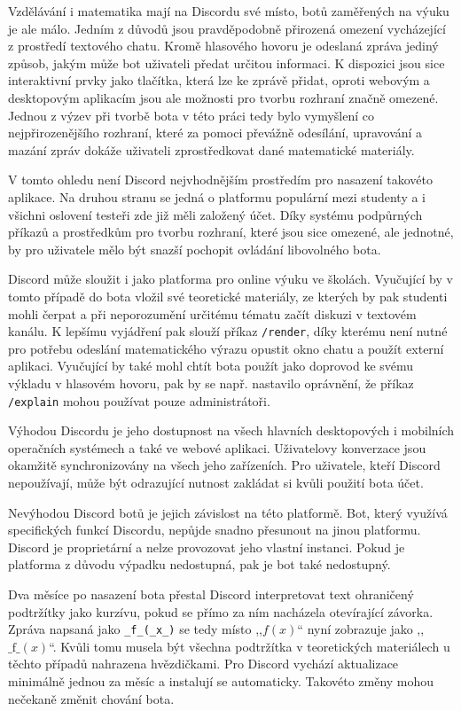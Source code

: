 \documentclass[FM]{tulthesis}
\begin{document}
	Vzdělávání i matematika mají na Discordu své místo, botů zaměřených na výuku je ale málo. Jedním z důvodů jsou pravděpodobně přirozená omezení vycházející z prostředí textového chatu. Kromě hlasového hovoru je odeslaná zpráva jediný způsob, jakým může bot uživateli předat určitou informaci. K dispozici jsou sice interaktivní prvky jako tlačítka, která lze ke zprávě přidat, oproti webovým a desktopovým aplikacím jsou ale možnosti pro tvorbu rozhraní značně omezené. Jednou z výzev při tvorbě bota v této práci tedy bylo vymyšlení co nejpřirozenějšího rozhraní, které za pomoci převážně odesílání, upravování a mazání zpráv dokáže uživateli zprostředkovat dané matematické materiály.
	
	V tomto ohledu není Discord nejvhodnějším prostředím pro nasazení takovéto aplikace. Na druhou stranu se jedná o platformu populární mezi studenty a i všichni oslovení testeři zde již měli založený účet. Díky systému podpůrných příkazů a prostředkům pro tvorbu rozhraní, které jsou sice omezené, ale jednotné, by pro uživatele mělo být snazší pochopit ovládání libovolného bota.
	
	Discord může sloužit i jako platforma pro online výuku ve školách. Vyučující by v tomto případě do bota vložil své teoretické materiály, ze kterých by pak studenti mohli čerpat a při neporozumění určitému tématu začít diskuzi v textovém kanálu. K lepšímu vyjádření pak slouží příkaz \verb|/render|, díky kterému není nutné pro potřebu odeslání matematického výrazu opustit okno chatu a použít externí aplikaci. Vyučující by také mohl chtít bota použít jako doprovod ke svému výkladu v hlasovém hovoru, pak by se např. nastavilo oprávnění, že příkaz \verb|/explain| mohou používat pouze administrátoři.
	
	Výhodou Discordu je jeho dostupnost na všech hlavních desktopových i mobilních operačních systémech a také ve webové aplikaci. Uživatelovy konverzace jsou okamžitě synchronizovány na všech jeho zařízeních. Pro uživatele, kteří Discord nepoužívají, může být odrazující nutnost zakládat si kvůli použití bota účet.
	
	Nevýhodou Discord botů je jejich závislost na této platformě. Bot, který využívá specifických funkcí Discordu, nepůjde snadno přesunout na jinou platformu. Discord je proprietární a nelze provozovat jeho vlastní instanci. Pokud je platforma z důvodu výpadku nedostupná, pak je bot také nedostupný.
	
	Dva měsíce po nasazení bota přestal Discord interpretovat text ohraničený podtržítky jako kurzívu, pokud se přímo za ním nacházela otevírající závorka. Zpráva napsaná jako \verb|_f_(_x_)| se tedy místo ,,$f(x)$`` nyní zobrazuje jako ,,$\_\mathrm{f}\_(x)$``. Kvůli tomu musela být všechna podtržítka v teoretických materiálech u těchto případů nahrazena hvězdičkami. Pro Discord vychází aktualizace minimálně jednou za měsíc a instalují se automaticky. Takovéto změny mohou nečekaně změnit chování bota.
\end{document}

